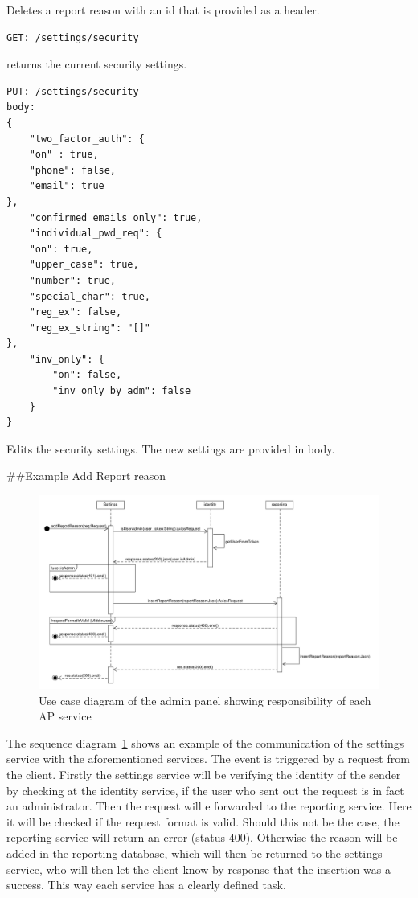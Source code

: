 Deletes a report reason with an id that is provided as a header.

\begin{verbatim}
GET: /settings/security
\end{verbatim}

returns the current security settings.

\begin{verbatim}
PUT: /settings/security
body:
{
    "two_factor_auth": {
    "on" : true,
    "phone": false,
    "email": true
},
    "confirmed_emails_only": true,
    "individual_pwd_req": {
    "on": true,
    "upper_case": true,
    "number": true,
    "special_char": true,
    "reg_ex": false,
    "reg_ex_string": "[]"
},
    "inv_only": {
        "on": false,
        "inv_only_by_adm": false
    }
}
\end{verbatim}
Edits the security settings.
The new settings are provided in body.

##Example Add Report reason
\begin{figure}[!ht]
    \centering
    \includegraphics[width=1.0\textwidth]{./images/SequenceDiagram_AddReportReason.pdf}
    \caption{Use case diagram of the admin panel showing responsibility of each AP service}
    \label{fig:addReportReason}
\end{figure}
The sequence diagram~\ref{fig:addReportReason} shows an example of the communication of the settings service with the aforementioned services.
The event is triggered by a request from the client.
Firstly the settings service will be verifying the identity of the sender by checking at the identity service, if the user who sent out the request is in fact an administrator.
Then the request will e forwarded to the reporting service. Here it will be checked if the request format is valid. Should this not be the case, the reporting service will return an error (status 400).
Otherwise the reason will be added in the reporting database, which will then be returned to the settings service, who will then let the client know by response that the insertion was a success.
This way each service has a clearly defined task.

